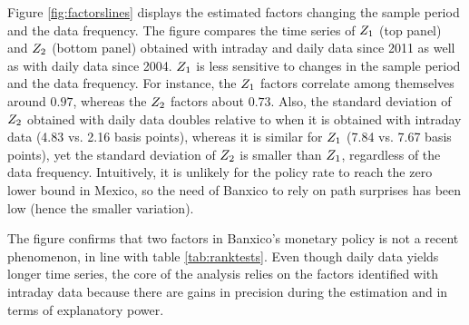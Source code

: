 {Figure \ref{fig:factorslines} displays the estimated factors changing %
the sample period and the data frequency. 
The figure compares the time series of \(Z_{1}\) (top panel) and \(Z_{2}\) (bottom panel) obtained with intraday and daily data since 2011 as well as with daily data since 2004. %
\(Z_{1}\) is less sensitive to changes in the sample period and the data frequency. 
For instance, the \(Z_{1}\) factors correlate among themselves around \(0.97\), whereas the \(Z_{2}\) factors about \(0.73\). 
Also, the standard deviation of \(Z_{2}\) obtained with daily data doubles relative to when it is obtained with intraday data (4.83 vs. 2.16 basis points), whereas it is similar for \(Z_{1}\) (7.84 vs. 7.67 basis points), yet the standard deviation of \(Z_{2}\) is smaller than \(Z_{1}\), regardless of the data frequency. 
Intuitively, it is unlikely for the policy rate to reach the zero lower bound in Mexico, so the need of Banxico to rely on path surprises has been low (hence the smaller variation).

The figure confirms that two factors in Banxico's monetary policy is not a recent phenomenon, in line with table \ref{tab:ranktests}. 
Even though daily data yields longer time series, the core of the analysis relies on the factors identified with intraday data because there are gains in precision during the estimation and in terms of explanatory power. %



}
